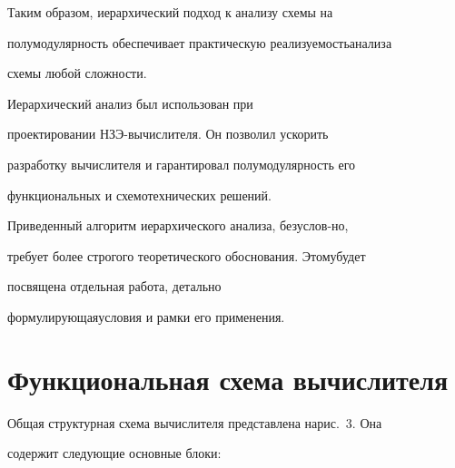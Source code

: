    Таким образом, иерархический подход к анализу схемы на


полумодулярность обеспечивает практическую реализуемость\linebreak  анализа


схемы любой сложности. 


Иерархический анализ был использован при


проектировании НЗЭ-вы\-чис\-ли\-те\-ля. Он позволил ускорить


разработку вычислителя и гарантировал полумодулярность его


функциональных и схемотехнических ре\-шений.








Приведенный алгоритм иерархического анализа, безуслов-\linebreak но,


требует более строгого теоретического обоснования. Этому\linebreak будет


посвящена отдельная работа, детально


формулирующая\linebreak усло\-вия и рамки его применения.





   \section{Функциональная схема вычислителя}





   Общая структурная схема вычислителя представлена на\linebreak  рис.~3. Она


содержит следующие основные блоки:


